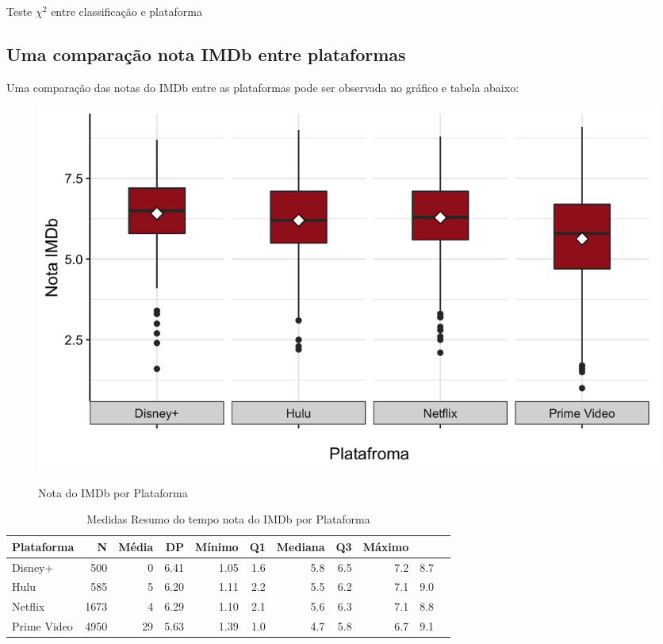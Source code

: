 \documentclass[a4paper, 12pt]{article} %
\begin{document}
\begin{quadro}[H]
\centering
\caption{Teste $\chi^2$ entre classificação e plataforma }
\label{R-Q-Teste-1}
\vspace{0.1cm}
\end{quadro}


\subsection {Uma comparação nota IMDb entre plataformas}
Uma comparação das notas do IMDb entre as plataformas pode ser observada no gráfico e tabela abaixo:

\begin{figure}[H]
    \centering
    \caption{Nota do IMDb por Plataforma}
    \includegraphics[scale=0.25]{Fig_IMDb_Plataforma.png}
    \label{fig:my_label}
\end{figure}

\begin{table}[H]
\caption{Medidas Resumo do tempo nota do IMDb por Plataforma}
\centering
\begin{tabular}{l|rrrrrrrrrr}
\hline
\multicolumn{1}{l|}{\textbf{Plataforma}} &
\multicolumn{1}{r}{\textbf{N}} &
\multicolumn{1}{r}{\textbf{Média}} &
\multicolumn{1}{r}{\textbf{DP}}&
\multicolumn{1}{r}{\textbf{Mínimo}}&
\multicolumn{1}{r}{\textbf{Q1}}&
\multicolumn{1}{r}{\textbf{Mediana}}&
\multicolumn{1}{r}{\textbf{Q3}}&
\multicolumn{1}{r}{\textbf{Máximo}}\\
\hline

Disney+ &  500 & 0 &  6.41 & 1.05 &  1.6 & 5.8 & 6.5 & 7.2 & 8.7 \\
Hulu & 585 & 5 &  6.20 & 1.11 & 2.2 & 5.5 & 6.2 & 7.1 & 9.0  \\
Netflix &  1673 & 4 &  6.29 & 1.10 &  2.1 & 5.6 & 6.3 & 7.1 & 8.8  \\
Prime Video &  4950 & 29 & 5.63 & 1.39 & 1.0 & 4.7 & 5.8 & 6.7 & 9.1  \\
\hline
\end{tabular}
\end{table}
\end{document}
